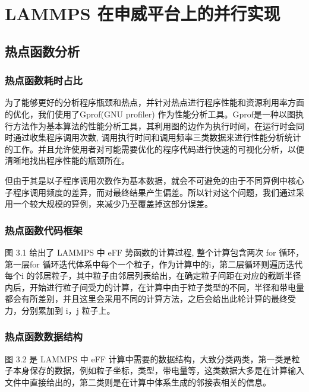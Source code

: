 
\chapter{LAMMPS 在申威平台上的并行实现}

\section{热点函数分析}
\subsection{热点函数耗时占比}
为了能够更好的分析程序瓶颈和热点，并针对热点进行程序性能和资源利用率方面的优化，我们使用了Gprof(GNU profiler)\cite{graham1982gprof} 作为性能分析工具。Gprof是一种以图执行方法作为基本算法的性能分析工具，其利用图的边作为执行时间，在运行时会同时通过收集程序调用次数, 调用执行时间和调用频率三类数据来进行性能分析统计的工作。并且允许使用者对可能需要优化的程序代码进行快速的可视化分析，以便清晰地找出程序性能的瓶颈所在。

但由于其是以子程序调用次数作为基本数据，就会不可避免的由于不同算例中核心子程序调用频度的差异，而对最终结果产生偏差。所以针对这个问题，我们通过采用一个较大规模的算例，来减少乃至覆盖掉这部分误差。

\subsection{热点函数代码框架}
图 3.1 给出了 LAMMPS 中 eFF 势函数的计算过程, 整个计算包含两次 for 循环，第一层for 循环迭代体系中每个一个粒子，作为计算中的i，第二层循环则遍历迭代每个i 的邻居粒子，其中粒子由邻居列表给出，在确定粒子间距在对应的截断半径内后，开始进行粒子间受力的计算，在计算中由于粒子类型的不同，半径和带电量都会有所差别，并且这里会采用不同的计算方法，之后会给出此轮计算的最终受力，分别累加到 i，j 粒子上。

\subsection{热点函数数据结构}
图 3.2 是 LAMMPS 中 eFF 计算中需要的数据结构，大致分类两类，第一类是粒子本身保存的数据，例如粒子坐标，类型，带电量等，这类数据大多是在计算输入文件中直接给出的，第二类则是在计算中体系生成的邻接表相关的信息。


